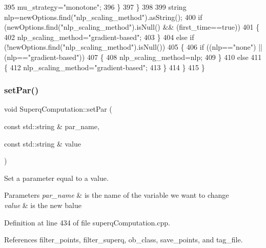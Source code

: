 \begin{DoxyCode}
395             mu_strategy=\textcolor{stringliteral}{"monotone"};
396         \}
397     \}
398 
399     \textcolor{keywordtype}{string} nlp=newOptions.find(\textcolor{stringliteral}{"nlp\_scaling\_method"}).asString();
400     \textcolor{keywordflow}{if} (newOptions.find(\textcolor{stringliteral}{"nlp\_scaling\_method"}).isNull() && (first\_time==\textcolor{keyword}{true}))
401     \{
402         nlp_scaling_method=\textcolor{stringliteral}{"gradient-based"};
403     \}
404     \textcolor{keywordflow}{else} \textcolor{keywordflow}{if} (!newOptions.find(\textcolor{stringliteral}{"nlp\_scaling\_method"}).isNull())
405     \{
406         \textcolor{keywordflow}{if} ((nlp==\textcolor{stringliteral}{"none"}) || (nlp==\textcolor{stringliteral}{"gradient-based"}))
407         \{
408             nlp_scaling_method=nlp;
409         \}
410         \textcolor{keywordflow}{else}
411         \{
412             nlp_scaling_method=\textcolor{stringliteral}{"gradient-based"};
413         \}
414     \}
415 \}
\end{DoxyCode}
\mbox{\label{classSuperqComputation_a1780009371c09327b8491189dee66b20}} 
\subsubsection{\texorpdfstring{set\+Par()}{setPar()}}
{\footnotesize\ttfamily void Superq\+Computation\+::set\+Par (\begin{DoxyParamCaption}\item[{const std\+::string \&}]{par\+\_\+name,  }\item[{const std\+::string \&}]{value }\end{DoxyParamCaption})}



Set a parameter equal to a value. 


\begin{DoxyParams}{Parameters}
{\em par\+\_\+name} & is the name of the variable we want to change \\
\hline
{\em value} & is the new balue \\
\hline
\end{DoxyParams}


Definition at line 434 of file superq\+Computation.\+cpp.



References filter\+\_\+points, filter\+\_\+superq, ob\+\_\+class, save\+\_\+points, and tag\+\_\+file.


